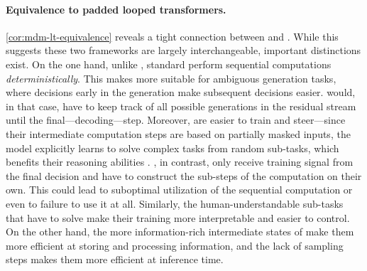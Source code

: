 \documentclass{article} %
\begin{document}
\paragraph{Equivalence to padded looped transformers.}
\cref{cor:mdm-lt-equivalence} reveals a tight connection between \MDMsAcr and \LTsAcr.
While this suggests these two frameworks are largely interchangeable, important distinctions exist.
On the one hand, unlike \MDMsAcr, standard \LTsAcr perform sequential computations \emph{deterministically}.
This makes \MDMsAcr more suitable for ambiguous generation tasks, where decisions early in the generation make subsequent decisions easier.
\LTsAcr would, in that case, have to keep track of all possible generations in the residual stream until the final---decoding---step.
Moreover, \MDMsAcr are easier to train and steer---since their intermediate computation steps are based on partially masked inputs, the model explicitly learns to solve complex tasks from random sub-tasks, which benefits their reasoning abilities \citep{kim2025trainworstplanbest}.
\LTsAcr, in contrast, only receive training signal from the final decision and have to construct the sub-steps of the computation on their own.
This could lead to suboptimal utilization of the sequential computation or even to failure to use it at all.
Similarly, the human-understandable sub-tasks that \MDMsAcr have to solve make their training more interpretable and easier to control. 
On the other hand, the more information-rich intermediate states of \LTsAcr make them more efficient at storing and processing information, and the lack of sampling steps makes them more efficient at inference time.
\end{document}
